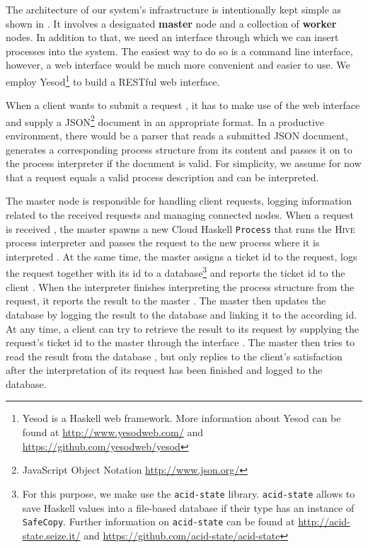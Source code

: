 The architecture of our system's infrastructure is intentionally kept simple as shown in . It involves a designated \textbf{master} node and a collection of \textbf{worker} nodes. In addition to that, we need an interface through which we can insert processes into the system. The easiest way to do so is a command line interface, however, a web interface would be much more convenient and easier to use. We employ Yesod\footnote{Yesod is a Haskell web framework. More information about Yesod can be found at \url{http://www.yesodweb.com/} and \url{https://github.com/yesodweb/yesod}} to build a RESTful web interface.

When a client wants to submit a request , it has to make use of the web interface and supply a JSON\footnote{JavaScript Object Notation \url{http://www.json.org/}} document in an appropriate format. In a productive environment, there would be a parser that reads a submitted JSON document, generates a corresponding process structure from its content and passes it on to the process interpreter if the document is valid. For simplicity, we assume for now that a request equals a valid process description and can be interpreted.

The master node is responsible for handling client requests, logging information related to the received requests and managing connected nodes. When a request is received , the master spawns a new \textsf{Cloud Haskell} \texttt{Process} that runs the \textsc{Hive} process interpreter and passes the request to the new process where it is interpreted . At the same time, the master assigns a ticket id to the request, logs the request together with its id to a database\footnote{For this purpose, we make use the \texttt{acid-state} library. \texttt{acid-state} allows to save Haskell values into a file-based database if their type has an instance of \texttt{SafeCopy}. Further information on \texttt{acid-state} can be found at \url{http://acid-state.seize.it/} and \url{https://github.com/acid-state/acid-state}}  and reports the ticket id to the client . When the interpreter finishes interpreting the process structure from the request, it reports the result to the master . The master then updates the database  by logging the result to the database and linking it to the according id. At any time, a client can try to retrieve the result to its request by supplying the request's ticket id to the master through the interface . The master then tries to read the result from the database , but only replies to the client's satisfaction after the interpretation of its request has been finished and logged to the database.

